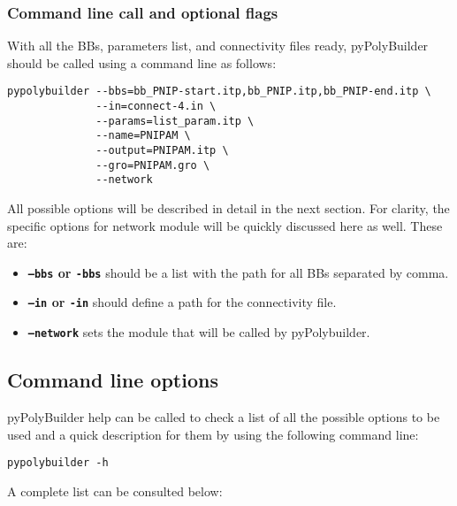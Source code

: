 \documentclass[12pt]{article}
\begin{document}
\subsubsection{Command line call and optional flags}
With all the BBs, parameters list, and connectivity files ready, pyPolyBuilder should be called using a command line as follows:

\begin{lstlisting}
pypolybuilder --bbs=bb_PNIP-start.itp,bb_PNIP.itp,bb_PNIP-end.itp \
              --in=connect-4.in \
              --params=list_param.itp \
              --name=PNIPAM \
              --output=PNIPAM.itp \
              --gro=PNIPAM.gro \
              --network
\end{lstlisting}

All possible options will be described in detail in the next section.
For clarity, the specific options for network module will be quickly discussed here as well.
These are:
\begin{itemize}
    \item \textbf{\texttt{--bbs} or \texttt{-bbs}} should be a list with the path for all BBs separated by comma.
    
    \item \textbf{\texttt{--in} or \texttt{-in}} should define a path for the connectivity file.
    
    \item \textbf{\texttt{--network}} sets the module that will be called by pyPolybuilder.
\end{itemize}

\subsection{Command line options}
\label{sec:CommandLine}

pyPolyBuilder help can be called to check a list of all the possible options to be used and a quick description for them by using the following command line:

\begin{lstlisting}
pypolybuilder -h
\end{lstlisting}

A complete list can be consulted below:
\end{document}
